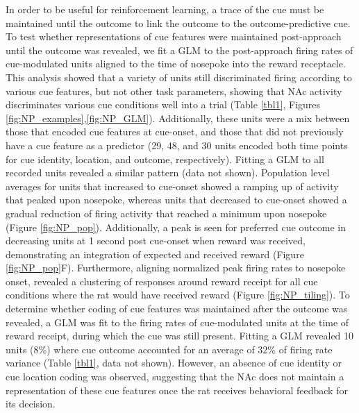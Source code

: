 \documentclass[11pt]{article}
\begin{document}
In order to be useful for reinforcement learning, a trace of the cue must be maintained until the outcome to link the outcome to the outcome-predictive cue. To test whether representations of cue features were maintained post-approach until the outcome was revealed, we fit a GLM to the post-approach firing rates of cue-modulated units aligned to the time of nosepoke into the reward receptacle. This analysis showed that a variety of units still discriminated firing according to various cue features, but not other task parameters, showing that NAc activity discriminates various cue conditions well into a trial (Table \ref{tbl1}, Figures \ref{fig:NP_examples},\ref{fig:NP_GLM}). Additionally, these units were a mix between those that encoded cue features at cue-onset, and those that did not previously have a cue feature as a predictor (29, 48, and 30 units encoded both time points for cue identity, location, and outcome, respectively). Fitting a GLM to all recorded units revealed a similar pattern (data not shown). Population level averages for units that increased to cue-onset showed a ramping up of activity that peaked upon nosepoke, whereas units that decreased to cue-onset showed a gradual reduction of firing activity that reached a minimum upon nosepoke (Figure \ref{fig:NP_pop}). Additionally, a peak is seen for preferred cue outcome in decreasing units at 1 second post cue-onset when reward was received, demonstrating an integration of expected and received reward (Figure \ref{fig:NP_pop}F). Furthermore, aligning normalized peak firing rates to nosepoke onset, revealed a clustering of responses around reward receipt for all cue conditions where the rat would have received reward (Figure \ref{fig:NP_tiling}). To determine whether coding of cue features was maintained after the outcome was revealed, a GLM was fit to the firing rates of cue-modulated units at the time of reward receipt, during which the cue was still present. Fitting a GLM revealed 10 units (8\%) where cue outcome accounted for an average of 32\% of firing rate variance (Table \ref{tbl1}, data not shown). However, an absence of cue identity or cue location coding was observed, suggesting that the NAc does not maintain a representation of these cue features once the rat receives behavioral feedback for its decision.
\end{document}
